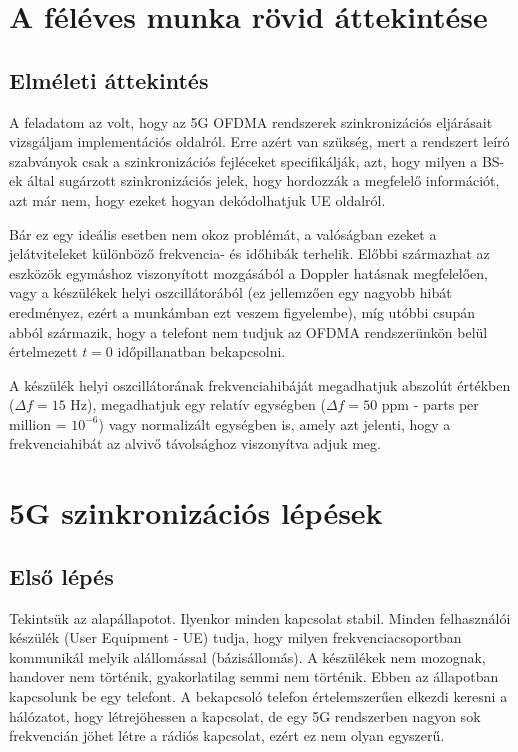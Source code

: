 \chapter{A féléves munka rövid áttekintése}

\section{Elméleti áttekintés}

A feladatom az volt, hogy az 5G OFDMA rendszerek szinkronizációs eljárásait vizsgáljam implementációs oldalról. 
Erre azért van szükség, mert a rendszert leíró szabványok csak a szinkronizációs fejléceket specifikálják, azt, hogy milyen a BS-ek által sugárzott szinkronizációs jelek, hogy hordozzák a megfelelő információt, azt már nem, hogy ezeket hogyan dekódolhatjuk UE oldalról.

Bár ez egy ideális esetben nem okoz problémát, a valóságban ezeket a jelátviteleket különböző frekvencia- és időhibák terhelik.
Előbbi származhat az eszközök egymáshoz viszonyított mozgásából a Doppler hatásnak megfelelően, vagy a készülékek helyi oszcillátorából (ez jellemzően egy nagyobb hibát eredményez, ezért a munkámban ezt veszem figyelembe), míg utóbbi csupán abból származik, hogy a telefont nem tudjuk az OFDMA rendszerünkön belül értelmezett $ t = 0 $ időpillanatban bekapcsolni.

A készülék helyi oszcillátorának frekvenciahibáját megadhatjuk abszolút értékben ($ \Delta f = 15 \text{ Hz}$), megadhatjuk egy relatív egységben ($\Delta f = 50 \text{ ppm}$ - parts per million = $10^{-6}$) vagy normalizált egységben is, amely azt jelenti, hogy a frekvenciahibát az alvivő távolsághoz viszonyítva adjuk meg.

\chapter{5G szinkronizációs lépések}

\section{Első lépés}

Tekintsük az alapállapotot. Ilyenkor minden kapcsolat stabil. Minden felhasználói készülék (User Equipment - UE) tudja, hogy milyen frekvenciacsoportban kommunikál melyik alállomással (bázisállomás). A készülékek nem mozognak, handover nem történik, gyakorlatilag semmi nem történik.
Ebben az állapotban kapcsolunk be egy telefont. A bekapcsoló telefon értelemszerűen elkezdi keresni a hálózatot, hogy létrejöhessen a kapcsolat, de egy 5G rendszerben nagyon sok frekvencián jöhet létre a rádiós kapcsolat, ezért ez nem olyan egyszerű. 